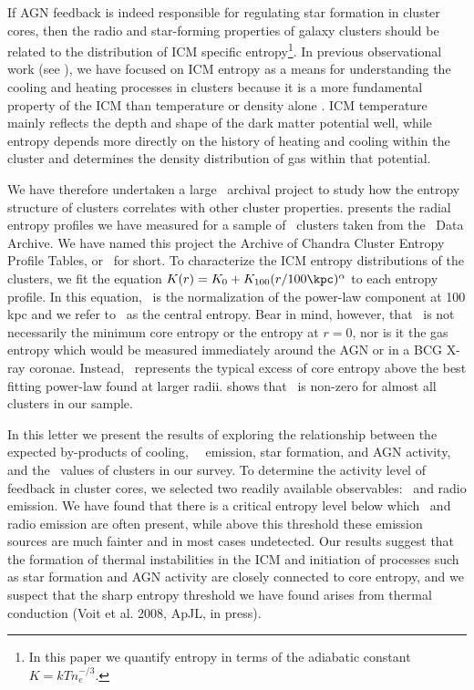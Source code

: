 \documentclass{emulateapj}
\begin{document}
If AGN feedback is indeed responsible for regulating star formation in
cluster cores, then the radio and star-forming properties of galaxy
clusters should be related to the distribution of ICM specific
entropy\footnote{In this paper we quantify entropy in terms of the
  adiabatic constant $K = kTn_e^{-/3}$.}. In previous observational
work (see \citealt{radioquiet, d06, accept}), we have focused on ICM
entropy as a means for understanding the cooling and heating processes
in clusters because it is a more fundamental property of the ICM than
temperature or density alone \citep{voitbryan,voitreview}. ICM
temperature mainly reflects the depth and shape of the dark matter
potential well, while entropy depends more directly on the history of
heating and cooling within the cluster and determines the density
distribution of gas within that potential.

We have therefore undertaken a large \Chandra\ archival project to
study how the entropy structure of clusters correlates with other
cluster properties. \cite{accept} presents the radial entropy profiles
we have measured for a sample of \clnum\ clusters taken from the
\Chandra\ Data Archive. We have named this project the Archive of
Chandra Cluster Entropy Profile Tables, or \accept\ for short. To
characterize the ICM entropy distributions of the clusters, we fit the
equation $K(r) = K_0 +K_{100}(r/100 \kpc)^{\alpha}$ to each entropy
profile. In this equation, \khun\ is the normalization of the
power-law component at 100 kpc and we refer to \kna\ as the central
entropy. Bear in mind, however, that \kna\ is not necessarily the
minimum core entropy or the entropy at $r=0$, nor is it the gas
entropy which would be measured immediately around the AGN or in a BCG
X-ray coronae. Instead, \kna\ represents the typical excess of core
entropy above the best fitting power-law found at larger
radii. \cite{accept} shows that \kna\ is non-zero for almost all
clusters in our sample.

In this letter we present the results of exploring the relationship
between the expected by-products of cooling, \eg\ \halpha\ emission,
star formation, and AGN activity, and the \kna\ values of clusters in
our survey. To determine the activity level of feedback in cluster
cores, we selected two readily available observables: \halpha\ and
radio emission. We have found that there is a critical entropy level
below which \halpha\ and radio emission are often present, while above
this threshold these emission sources are much fainter and in most
cases undetected. Our results suggest that the formation of thermal
instabilities in the ICM and initiation of processes such as star
formation and AGN activity are closely connected to core entropy, and
we suspect that the sharp entropy threshold we have found arises from
thermal conduction (Voit et al. 2008, ApJL, in press).
\end{document}
